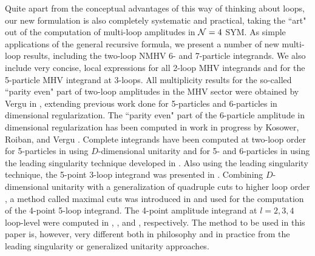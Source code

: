 \documentclass[11pt, reqno]{article}
\begin{document}
Quite apart from the conceptual advantages of this way of thinking about loops, our new formulation is also
completely systematic and practical, taking the ``art" out of the computation of multi-loop amplitudes in ${\cal N}=4$ SYM. As simple applications
of the general recursive formula, we present a number of new
multi-loop results, including the two-loop NMHV 6- and 7-particle integrands. We also include very concise, local expressions for all 2-loop
MHV integrands and for the 5-particle MHV integrand at 3-loops. All multiplicity results for the so-called ``parity even" part of two-loop amplitudes in the MHV sector were obtained by Vergu in \cite{Vergu:2009tu}, extending previous work done for 5-particles \cite{Bern:2007ct} and 6-particles \cite{Bern:2008ap,Cachazo:2008hp} in dimensional regularization. The ``parity even" part of the 6-particle amplitude in dimensional regularization has been computed in work in progress by Kosower, Roiban, and Vergu \cite{KRV}. Complete integrands have been computed at two-loop order for 5-particles in \cite{Bern:2007ct} using $D$-dimensional unitarity and for 5- and 6-particles in \cite{Cachazo:2008vp,Cachazo:2008hp} using the leading singularity technique developed in \cite{Buchbinder:2005wp,Cachazo:2008vp}. Also using the leading singularity technique, the 5-point 3-loop integrand was presented in \cite{Spradlin:2008uu}. Combining $D$-dimensional unitarity with a generalization of quadruple cuts to higher loop order \cite{Buchbinder:2005wp}, a method called maximal cuts was introduced in \cite{Bern:2007ct} and used for the computation of the 4-point 5-loop integrand. The 4-point amplitude integrand at $l=2,3,4$ loop-level were computed in \cite{Anastasiou:2003kj}, \cite{Bern:2005iz}, and \cite{Bern:2006ew}, respectively.  The method to be used in this paper is, however, very different both in philosophy and in practice from the leading singularity or generalized unitarity approaches.
\end{document}
